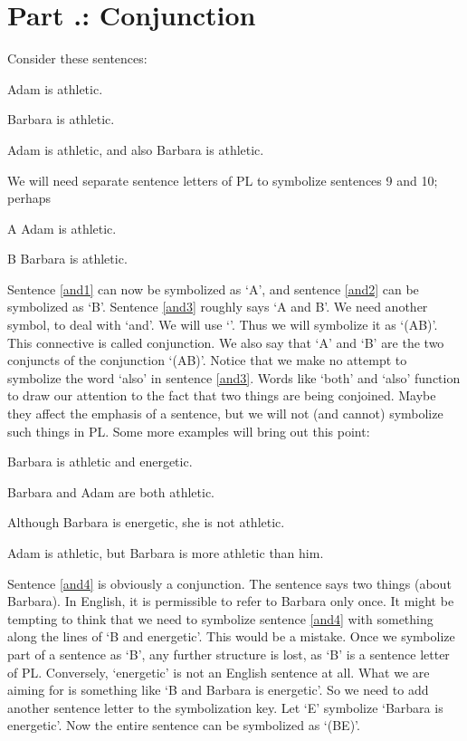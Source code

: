 \section{Part \thechapcount.\theseccount: Conjunction}
\label{s:Part 5.2: Conjunction}
Consider these sentences:
	\begin{earg}
		\item[\ex{and1}]Adam is athletic.
		\item[\ex{and2}]Barbara is athletic.
		\item[\ex{and3}]Adam is athletic, and also Barbara is athletic.
	\end{earg}
We will need separate sentence letters of PL to symbolize sentences 9 and 10; perhaps
	\begin{ekey}
		\item[A] Adam is athletic.
		\item[B] Barbara is athletic.
	\end{ekey}
Sentence \ref{and1} can now be symbolized as ‘A’, and sentence \ref{and2} can be symbolized as ‘B’. Sentence \ref{and3} roughly says ‘A and B’. We need another symbol, to deal with ‘and’. We will use ‘\eand’. Thus we will symbolize it as ‘(A\eand B)’. This connective is called \gls{conjunction}. We also say that ‘A’ and ‘B’ are the two \glspl{conjunct} of the conjunction ‘(A\eand B)’.
Notice that we make no attempt to symbolize the word ‘also’ in sentence  \ref{and3}. Words like ‘both’ and ‘also’ function to draw our attention to the fact that two things are being conjoined. Maybe they affect the emphasis of a sentence, but we will not (and cannot) symbolize such things in PL.
Some more examples will bring out this point:
	\begin{earg}
		\item[\ex{and4}]Barbara is athletic and energetic.
		\item[\ex{and5}]Barbara and Adam are both athletic.
		\item[\ex{and6}]Although Barbara is energetic, she is not athletic.
		\item[\ex{and7}]Adam is athletic, but Barbara is more athletic than him.
	\end{earg}
Sentence \ref{and4} is obviously a conjunction. The sentence says two things (about Barbara). In English, it is permissible to refer to Barbara only once. It might be tempting to think that we need to symbolize sentence \ref{and4} with something along the lines of ‘B and energetic’. This would be a mistake. Once we symbolize part of a sentence as ‘B’, any further structure is lost, as ‘B’ is a sentence letter of PL. Conversely, ‘energetic’ is not an English sentence at all. What we are aiming for is something like ‘B and Barbara is energetic’. So we need to add another sentence letter to the symbolization key. Let ‘E’ symbolize ‘Barbara is energetic’. Now the entire sentence can be symbolized as ‘(B\eand E)’.

